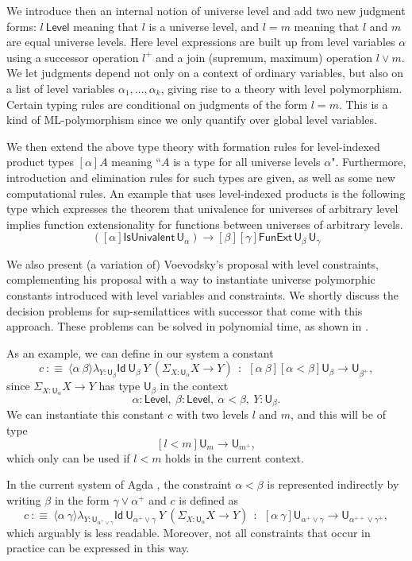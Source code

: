 \documentclass[11pt,a4paper]{article}
\theoremstyle{definition}
\newcommand{\Id}{\mathsf{Id}}
\newcommand{\lam}[2]{{\langle}#1{\rangle}#2}
\def\UU{\mathsf{U}}
\def\Level{\mathsf{Level}}
\begin{document}
  We introduce then an internal notion of universe level and
  add two new judgment forms: $l\ \Level$ meaning that $l$ is a universe level, 
  and $l = m$ meaning that $l$ and $m$ are equal universe levels. 
  Here level expressions are built up from level variables $\alpha$ 
  using a successor operation $l^+$ and 
  a join (supremum, maximum) operation $l \vee m$.
  We let judgments depend not only on a context of ordinary variables, 
  but also on a list of level variables $\alpha_1, \ldots, \alpha_k$, 
  giving rise to a theory with level polymorphism.
  Certain typing rules are conditional on judgments of the form $l=m$. 
  This is a kind of ML-polymorphism since we only quantify over global level variables. 
  
  We then extend the above type theory with formation rules for level-indexed product 
  types $[\alpha]A$ meaning ``$A$ is a type for all universe levels $\alpha$".
  Furthermore, introduction and elimination rules for such types are given,
  as well as some new computational rules. An example that uses level-indexed products 
  is the following type which  expresses the theorem that univalence for universes 
  of arbitrary level implies function extensionality for functions between 
  universes of arbitrary levels.
$$
([\alpha]\mathsf{IsUnivalent}\, \UU_\alpha)
\to [\beta][\gamma] \mathsf{FunExt}\, \UU_\beta\, \UU_\gamma
$$

We also present (a variation of) Voevodsky's proposal \cite{VV} with level constraints,
complementing his proposal with a way to instantiate universe polymorphic
constants introduced with level variables and constraints.
  We shortly discuss the decision problems for sup-semilattices with
  successor that come with this approach. These problems can be solved 
  in polynomial time, as shown in \cite{bezem-coquand:lattices}.
  
  \medskip
  
As an example, we can define in our system a constant
$$
c~:\equiv~\lam{\alpha~\beta}\lambda_{Y:\UU_{\beta}}\Id~{\UU_{\beta}}~Y~ (\Sigma_{X:\UU_{\alpha}}X\rightarrow Y)~~:~~
   [\alpha~\beta][\alpha<\beta]\UU_{\beta} \rightarrow \UU_{\beta^+},
$$
since $\Sigma_{X:\UU_{\alpha}}X\rightarrow Y$ has type $\UU_{\beta}$ in the context
   $$\alpha:\Level,~\beta:\Level,~\alpha<\beta,~Y:\UU_{\beta}.$$
We can instantiate this constant $c$ with two levels $l$ and $m$, 
   and this will be of type
   $$[l<m]\UU_{m} \rightarrow \UU_{m^+},$$
which only can be used if $l<m$ holds in the current context.

   \medskip

In the current system of Agda \cite{agda-manual}, 
the constraint $\alpha<\beta$ is represented indirectly by
writing $\beta$ in the form $\gamma\vee \alpha^+$ and $c$ is defined as
$$
c~:\equiv~\lam{\alpha~\gamma}\lambda_{Y:\UU_{\alpha^+\vee\gamma}}\Id~{\UU_{\alpha^+\vee\gamma}}~Y~ (\Sigma_{X:\UU_{\alpha}}X\rightarrow Y)~~:~~
   [\alpha~\gamma]\UU_{\alpha^+\vee\gamma} \rightarrow \UU_{\alpha^{++}\vee\gamma^+},
$$
   which arguably is less readable. Moreover, not all constraints that occur in practice
   can be expressed in this way.




\end{document}
